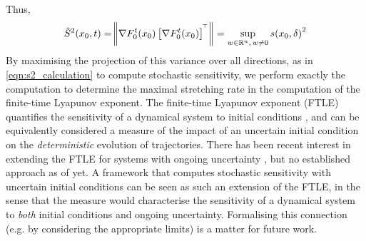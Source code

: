 Thus,
\[
	\tilde{S}^2\!\left(x_0, t\right) = \norm{\nabla F_0^t\!\left(x_0\right)\left[\nabla F_0^t\!\left(x_0\right)\right]^{^{\!\top}}} = \sup_{w \in \mathbb{R}^n, \, w \neq 0}{s\!\left(x_0, \delta\right)^2}
\]
By maximising the projection of this variance over all directions, as in \cref{eqn:s2_calculation} to compute stochastic sensitivity, we perform exactly the computation to determine the maximal stretching rate in the computation of the finite-time Lyapunov exponent.
The finite-time Lyapunov exponent (FTLE) quantifies the sensitivity of a dynamical system to initial conditions \citep{ShaddenEtAl_2005_DefinitionPropertiesLagrangian}, and can be equivalently considered a measure of the impact of an uncertain initial condition on the \emph{deterministic} evolution of trajectories.
There has been recent interest in extending the FTLE for systems with ongoing uncertainty \citep{Balasuriya_2020_UncertaintyFinitetimeLyapunov,YouLeung_2021_ComputingFiniteTime,GuoEtAl_2016_FiniteTimeLyapunovExponents}, but no established approach as of yet.
A framework that computes stochastic sensitivity with uncertain initial conditions can be seen as such an extension of the FTLE, in the sense that the measure would characterise the sensitivity of a dynamical system to \emph{both} initial conditions and ongoing uncertainty.
Formalising this connection (e.g. by considering the appropriate limits) is a matter for future work.

